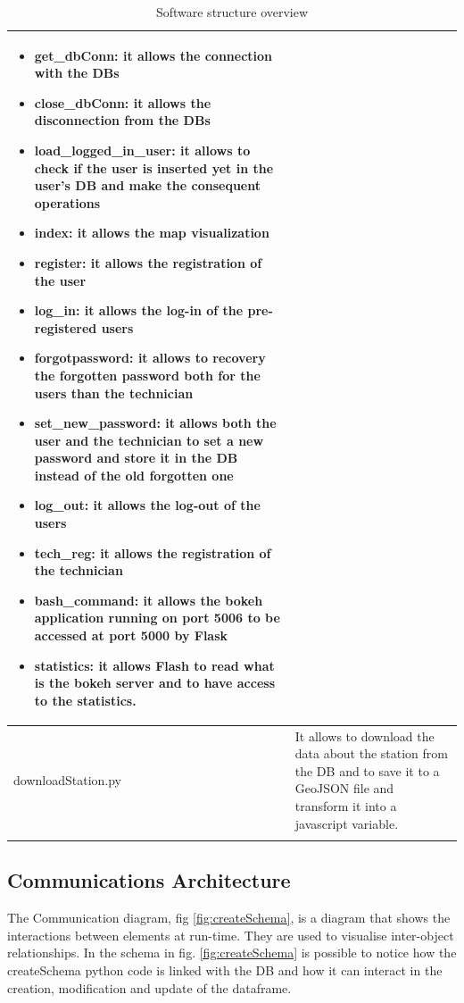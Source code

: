 \documentclass{article}
\begin{document}
\begin{longtable}[H]{|l|p{}|}
\begin{itemize}
         \item get\_dbConn: it allows the connection with the  DBs
         \item close\_dbConn: it allows the disconnection from the  DBs
         \item load\_logged\_in\_user: it allows to check if the user is inserted yet in the user’s DB and make the consequent operations
         \item index: it allows the map visualization
         \item register: it allows the registration of the user
         \item log\_in: it allows the log-in of the pre-registered users
         \item forgotpassword: it allows to recovery the forgotten password both for the users than the technician
         \item set\_new\_password: it allows both the user and the technician to set a new password and store it in the DB instead of the old forgotten one
         \item log\_out: it allows the log-out of the users 
         \item tech\_reg: it allows the registration of the technician
         \item bash\_command: it allows the bokeh application running on port 5006 to be accessed at port 5000 by Flask
         \item statistics: it allows Flash to read what is the bokeh server and to have access to the statistics.
     \end{itemize}
     \\
    \hline
    downloadStation.py & It allows to download the data about the station from the DB and to save it to a GeoJSON file and transform it into a javascript variable. 
      \\
    \hline
\caption{Software structure overview } \\
\end{longtable}
      
\subsection{Communications Architecture}
The Communication diagram, fig \ref{fig:createSchema}, is a diagram that shows the interactions between elements at run-time. They  are used to visualise inter-object relationships.
In the schema in fig. \ref{fig:createSchema} is possible to notice how the createSchema python code is linked with the DB and how it can interact in the creation, modification and update of the dataframe.
\end{document}

